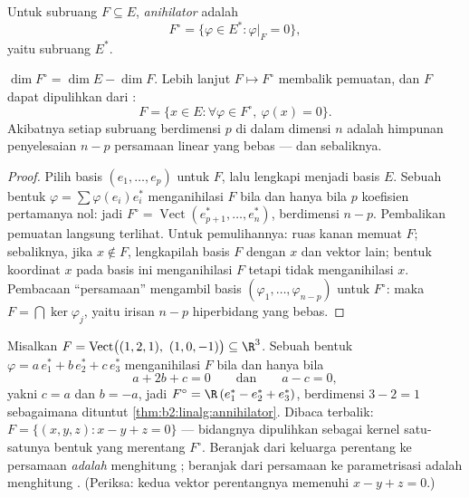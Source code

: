 \begin{definition}[Anihilator]\label{def:b2:linalg:annihilator}
Untuk subruang $F \subseteq E$,
\emph{anihilator} adalah
\[
F^{\circ} = \{\varphi \in E^* : \varphi|_F = 0\},
\]
yaitu subruang $E^*$.
\end{definition}

\begin{theorem}\label{thm:b2:linalg:annihilator}
$\dim F^{\circ} = \dim E - \dim F$. Lebih lanjut $F \mapsto F^\circ$
membalik pemuatan, dan $F$ dapat dipulihkan dari :
\[
F = \{x \in E : \forall\varphi \in F^\circ,\ \varphi(x) = 0\}.
\]
Akibatnya setiap subruang berdimensi $p$ di dalam dimensi $n$ adalah
himpunan penyelesaian $n - p$ persamaan linear yang bebas --- dan
sebaliknya.
\end{theorem}

\begin{proof}
Pilih basis $(e_1, \dots, e_p)$ untuk $F$, lalu lengkapi menjadi basis
$E$. Sebuah bentuk $\varphi = \sum \varphi(e_i) e_i^*$ menganihilasi $F$
bila dan hanya bila $p$ koefisien pertamanya nol: jadi $F^\circ =
\operatorname{Vect}(e_{p+1}^*, \dots, e_n^*)$, berdimensi $n - p$.
Pembalikan pemuatan langsung terlihat. Untuk pemulihannya: ruas kanan
memuat $F$; sebaliknya, jika $x \notin F$, lengkapilah basis
$F$ dengan $x$ dan vektor lain; bentuk koordinat $x$ pada basis ini
menganihilasi $F$ tetapi tidak menganihilasi $x$. Pembacaan ``persamaan''
mengambil basis $(\varphi_1, \dots, \varphi_{n-p})$ untuk $F^\circ$: maka $F =
\bigcap \ker\varphi_j$, yaitu irisan $n - p$ hiperbidang yang bebas.
\end{proof}

\begin{example}\label{ex:b2:linalg:annihilatorwork}
Misalkan $F = \operatorname{Vect}\bigl((1, 2, 1),\ (1, 0, -1)\bigr)
\subseteq \R^3$. Sebuah bentuk $\varphi = a\,e_1^* + b\,e_2^* + c\,e_3^*$
menganihilasi $F$ bila dan hanya bila
\[
a + 2b + c = 0
\qquad\text{dan}\qquad
a - c = 0 ,
\]
yakni $c = a$ dan $b = -a$, jadi $F^\circ = \R\,(e_1^* - e_2^* +
e_3^*)$, berdimensi $3 - 2 = 1$ sebagaimana dituntut
\cref{thm:b2:linalg:annihilator}. Dibaca terbalik:
$F = \{(x, y, z) : x - y + z = 0\}$ --- bidangnya dipulihkan sebagai
kernel satu-satunya bentuk yang merentang $F^\circ$. Beranjak dari
keluarga perentang ke persamaan \emph{adalah} menghitung ;
beranjak dari persamaan ke parametrisasi adalah menghitung
. (Periksa: kedua vektor perentangnya memenuhi $x - y +
z = 0$.)
\end{example}

